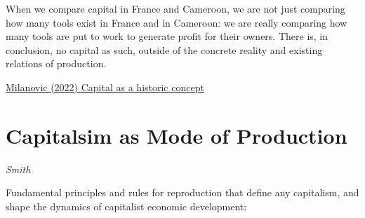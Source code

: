 \documentclass[
]{book}
\begin{document}
When we compare capital in France and Cameroon, we are not just comparing how many tools exist in France and in Cameroon: we are really comparing how many tools are put to work to generate profit for their owners. There is, in conclusion, no capital as such, outside of the concrete reality and existing relations of production.

\href{https://branko2f7.substack.com/p/capital-as-a-historic-concept}{Milanovic (2022) Capital as a historic concept}

\hypertarget{capitalsim-as-mode-of-production}{%
\section{Capitalsim as Mode of Production}\label{capitalsim-as-mode-of-production}}

\emph{Smith}

Fundamental principles and rules for reproduction that define any capitalism,
and shape the dynamics of capitalist economic development:
\end{document}
